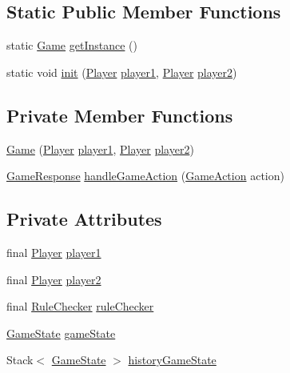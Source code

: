 \subsection*{Static Public Member Functions}
\begin{DoxyCompactItemize}
\item 
static \mbox{\hyperlink{classgame_1_1_game}{Game}} \mbox{\hyperlink{classgame_1_1_game_a748613e7961431f1ab626475cf9c191b}{get\+Instance}} ()
\item 
static void \mbox{\hyperlink{classgame_1_1_game_ab06907ac42599c20175756897f58db82}{init}} (\mbox{\hyperlink{interfaceplayer_1_1_player}{Player}} \mbox{\hyperlink{classgame_1_1_game_a1420ce19f9fb8c53fc5c5cc5376b75b9}{player1}}, \mbox{\hyperlink{interfaceplayer_1_1_player}{Player}} \mbox{\hyperlink{classgame_1_1_game_a33d37e82a46b32c0679fa2dadf06e693}{player2}})
\end{DoxyCompactItemize}
\subsection*{Private Member Functions}
\begin{DoxyCompactItemize}
\item 
\mbox{\hyperlink{classgame_1_1_game_aa7ac6d17ad9e5c24164d50f958c01f13}{Game}} (\mbox{\hyperlink{interfaceplayer_1_1_player}{Player}} \mbox{\hyperlink{classgame_1_1_game_a1420ce19f9fb8c53fc5c5cc5376b75b9}{player1}}, \mbox{\hyperlink{interfaceplayer_1_1_player}{Player}} \mbox{\hyperlink{classgame_1_1_game_a33d37e82a46b32c0679fa2dadf06e693}{player2}})
\item 
\mbox{\hyperlink{classui_1_1_game_response}{Game\+Response}} \mbox{\hyperlink{classgame_1_1_game_a1847ff6b22bd747cc2983a261a79aed2}{handle\+Game\+Action}} (\mbox{\hyperlink{classrule_engine_1_1_game_action}{Game\+Action}} action)
\end{DoxyCompactItemize}
\subsection*{Private Attributes}
\begin{DoxyCompactItemize}
\item 
final \mbox{\hyperlink{interfaceplayer_1_1_player}{Player}} \mbox{\hyperlink{classgame_1_1_game_a1420ce19f9fb8c53fc5c5cc5376b75b9}{player1}}
\item 
final \mbox{\hyperlink{interfaceplayer_1_1_player}{Player}} \mbox{\hyperlink{classgame_1_1_game_a33d37e82a46b32c0679fa2dadf06e693}{player2}}
\item 
final \mbox{\hyperlink{classrule_engine_1_1_rule_checker}{Rule\+Checker}} \mbox{\hyperlink{classgame_1_1_game_a804b73826eb085569b250318805ca4cc}{rule\+Checker}}
\item 
\mbox{\hyperlink{classgame_1_1game_state_1_1_game_state}{Game\+State}} \mbox{\hyperlink{classgame_1_1_game_a9b3fdf71d39fee9650f49b4dd320bcb2}{game\+State}}
\item 
Stack$<$ \mbox{\hyperlink{classgame_1_1game_state_1_1_game_state}{Game\+State}} $>$ \mbox{\hyperlink{classgame_1_1_game_a061601e0aeb31b8d67bd5bc13a8cebdf}{history\+Game\+State}}
\end{DoxyCompactItemize}
